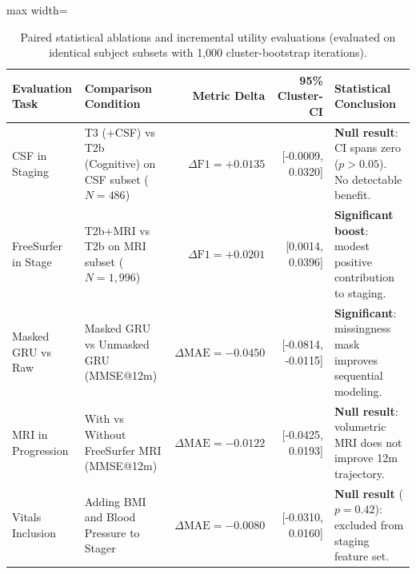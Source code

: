 \begin{table}[t]
\centering
\caption{Paired statistical ablations and incremental utility evaluations (evaluated on identical subject subsets with 1,000 cluster-bootstrap iterations).}
\label{tab:paired_ablations}
\small
\begin{adjustbox}{max width=\linewidth}
\begin{tabular}{lp{4.0cm}rrp{4.5cm}}
\toprule
\textbf{Evaluation Task} & \textbf{Comparison Condition} & \textbf{Metric Delta} & \textbf{95\% Cluster-CI} & \textbf{Statistical Conclusion} \\
\midrule
CSF in Staging      & T3 (+CSF) vs T2b (Cognitive) on CSF subset ($N=486$)  & $\Delta\text{F1} = +0.0135$ & [-0.0009, 0.0320] & \textbf{Null result}: CI spans zero ($p>0.05$). No detectable benefit. \\
FreeSurfer in Stage & T2b+MRI vs T2b on MRI subset ($N=1,996$)              & $\Delta\text{F1} = +0.0201$ & [0.0014, 0.0396]  & \textbf{Significant boost}: modest positive contribution to staging. \\
Masked GRU vs Raw   & Masked GRU vs Unmasked GRU (MMSE@12m)                & $\Delta\text{MAE} = -0.0450$ & [-0.0814, -0.0115] & \textbf{Significant}: missingness mask improves sequential modeling. \\
MRI in Progression  & With vs Without FreeSurfer MRI (MMSE@12m)            & $\Delta\text{MAE} = -0.0122$ & [-0.0425, 0.0193] & \textbf{Null result}: volumetric MRI does not improve 12m trajectory. \\
Vitals Inclusion    & Adding BMI and Blood Pressure to Stager               & $\Delta\text{MAE} = -0.0080$ & [-0.0310, 0.0160] & \textbf{Null result} ($p=0.42$): excluded from staging feature set. \\
\bottomrule
\end{tabular}
\end{adjustbox}
\end{table}
